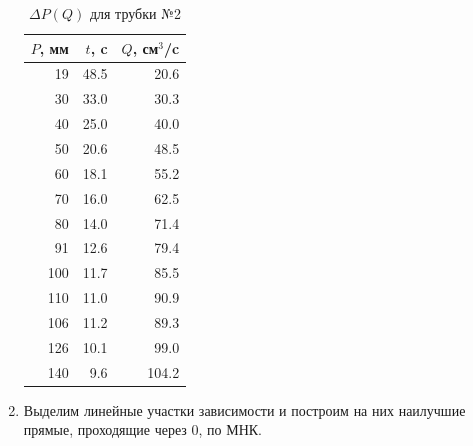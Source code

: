 \documentclass[12pt]{article}
\begin{document}
\begin{enumerate}
        \begin{table}[h!]
        \centering
        \begin{tabular}{|r|r|r|}
        \toprule
          $P$, мм &    $t$, c &     $Q$, см$^3$/c \\
        \midrule
         19 & 48.5 &  20.6 \\
         30 & 33.0 &  30.3 \\
         40 & 25.0 &  40.0 \\
         50 & 20.6 &  48.5 \\
         60 & 18.1 &  55.2 \\
         70 & 16.0 &  62.5 \\
         80 & 14.0 &  71.4 \\
         91 & 12.6 &  79.4 \\
        100 & 11.7 &  85.5 \\
        110 & 11.0 &  90.9 \\
        106 & 11.2 &  89.3 \\
        126 & 10.1 &  99.0 \\
        140 &  9.6 & 104.2 \\
        \bottomrule
        \end{tabular}
        \caption{$\Delta P(Q)$ для трубки №2}
        \label{tab:thin}
        \end{table}

    \item Выделим линейные участки зависимости и построим на них наилучшие прямые,
    проходящие через 0, по МНК.
\end{enumerate}
\end{document}
